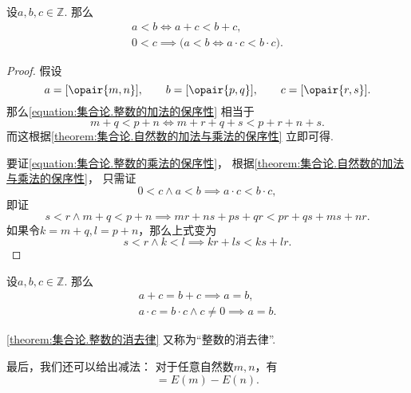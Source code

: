 \begin{theorem}\label{theorem:集合论.整数的加法与乘法的保序性}
设\(a,b,c\in\mathbb{Z}\).
那么\begin{gather}
	a<b \iff a+c<b+c,
	\label{equation:集合论.整数的加法的保序性} \\
	0<c \implies \bigl(
		a<b \iff a \cdot c < b \cdot c
	\bigr).
	\label{equation:集合论.整数的乘法的保序性}
\end{gather}
\begin{proof}
假设\begin{equation*}
	a=[\opair{m,n}], \qquad
	b=[\opair{p,q}], \qquad
	c=[\opair{r,s}].
\end{equation*}
那么\cref{equation:集合论.整数的加法的保序性} 相当于\begin{equation*}
	m+q<p+n \iff m+r+q+s<p+r+n+s.
\end{equation*}
而这根据\cref{theorem:集合论.自然数的加法与乘法的保序性} 立即可得.

要证\cref{equation:集合论.整数的乘法的保序性}，
根据\cref{theorem:集合论.自然数的加法与乘法的保序性}，
只需证\begin{equation*}
	0<c \land a<b \implies a \cdot c < b \cdot c,
\end{equation*}
即证\begin{equation*}
	s<r \land m+q<p+n \implies mr+ns+ps+qr<pr+qs+ms+nr.
\end{equation*}
如果令\(k=m+q, l=p+n\)，那么上式变为\begin{equation*}
	s<r \land k<l \implies kr+ls<ks+lr.
\end{equation*}
\end{proof}
\end{theorem}

\begin{corollary}\label{theorem:集合论.整数的消去律}
设\(a,b,c\in\mathbb{Z}\).
那么\begin{gather*}
	a+c=b+c \implies a=b, \\
	a \cdot c = b \cdot c \land c \neq 0 \implies a=b.
\end{gather*}
\end{corollary}
\cref{theorem:集合论.整数的消去律} 又称为“整数的消去律”.

最后，我们还可以给出减法：%
对于任意自然数\(m,n\)，有\begin{equation*}
	[\opair{m,n}]=E(m)-E(n).
\end{equation*}
